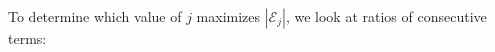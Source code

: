 \documentclass[journal=mamobx,manuscript=article]{achemso}
\begin{document}
To determine which value of $j$ maximizes $|\mathcal{E}_j|$, we look at ratios of consecutive terms:
\end{document}
